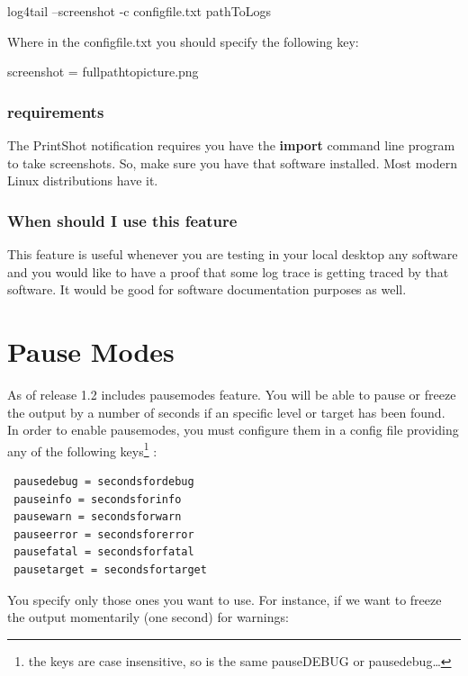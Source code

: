 \begin{cmd}
 log4tail --screenshot -c configfile.txt pathToLogs
\end{cmd}

Where in the configfile.txt you should specify the following key:

\begin{config}
screenshot = fullpathtopicture.png
\end{config}

\subsubsection{requirements}
The PrintShot notification requires you have the \textbf{import} command line
program to take screenshots. So, make sure you have that software installed.
Most modern Linux distributions have it. 

\subsubsection{When should I use this feature}
This feature is useful whenever you are testing in your local desktop any
software and you would like to have a proof that some log trace is getting
traced by that software. It would be good for software documentation purposes
as well. 

\section{Pause Modes}
\label{sec:PauseModes}
As of release 1.2 \logftailer{} includes pausemodes feature. You will be able
to pause or freeze the output by a number of seconds if an specific level or
target has been found. In order to enable pausemodes, you must configure them
in a config file providing any of the following keys\footnote{the keys are case
insensitive, so is the same pauseDEBUG or pausedebug\ldots} :

\begin{config}
\begin{verbatim}
 pausedebug = secondsfordebug
 pauseinfo = secondsforinfo
 pausewarn = secondsforwarn
 pauseerror = secondsforerror
 pausefatal = secondsforfatal
 pausetarget = secondsfortarget
\end{verbatim}
\end{config}

\noindent
You specify only those ones you want to use.
For instance, if we want to freeze the output momentarily (one second) for warnings:

